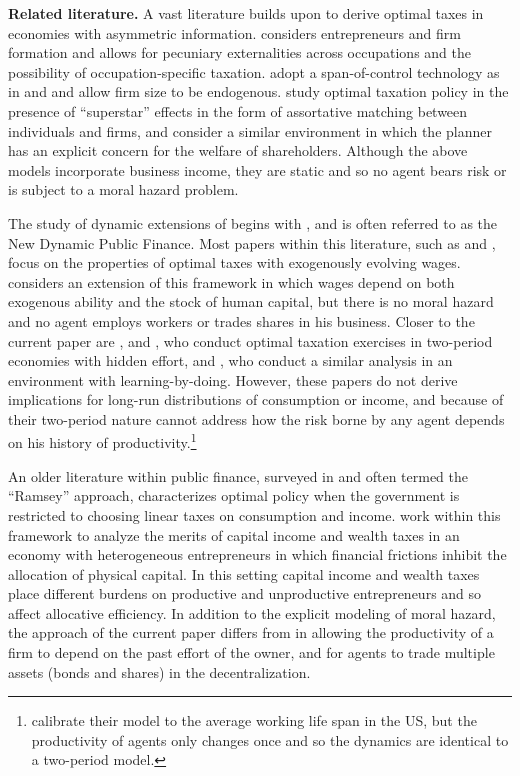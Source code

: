 \documentclass[11pt]{article}
\theoremstyle{plain}
\begin{document}
\textbf{Related literature.} A vast literature builds upon \cite{mirrlees_exploration_1971} to derive optimal taxes in economies with asymmetric information. \cite{scheuer_entrepreneurial_2014} considers entrepreneurs and firm formation and allows for pecuniary externalities across occupations and the possibility of occupation-specific taxation. \cite{ales_taxing_2017} adopt a span-of-control technology as in \cite{rosen_authority_1982} and \cite{lucas_size_1978} and allow firm size to be endogenous. \cite{scheuer_taxation_2017} study optimal taxation policy in the presence of ``superstar'' effects in the form of assortative matching between individuals and firms, and \cite{ales_taxing_2016} consider a similar environment in which the planner has an explicit concern for the welfare of shareholders. Although the above models incorporate business income, they are static and so no agent bears risk or is subject to a moral hazard problem. 

The study of dynamic extensions of \cite{mirrlees_exploration_1971} begins with \cite{golosov_optimal_2003}, and is often referred to as the New Dynamic Public Finance. Most papers within this literature, such as \cite{golosov_redistribution_2016} and \cite{farhi_insurance_2013}, focus on the properties of optimal taxes with exogenously evolving wages. \cite{stantcheva_optimal_2017} considers an extension of this framework in which wages depend on both exogenous ability and the stock of human capital, but there is no moral hazard and no agent employs workers or trades shares in his business. Closer to the current paper are \cite{albanesi_optimal_2006}, \cite{kapicka_optimal_2019} and \cite{best_optimal_2012}, who conduct optimal taxation exercises in two-period economies with hidden effort, and \cite{makris_taxation_2021}, who conduct a similar analysis in an environment with learning-by-doing. However, these papers do not derive implications for long-run distributions of consumption or income, and because of their two-period nature cannot address how the risk borne by any agent depends on his history of productivity.\footnote{\cite{makris_taxation_2021} calibrate their model to the average working life span in the US, but the productivity of agents only changes once and so the dynamics are identical to a two-period model.} 


An older literature within public finance, surveyed in \cite{chari_optimal_1999} and often termed the ``Ramsey'' approach, characterizes optimal policy when the government is restricted to choosing linear taxes on consumption and income. \cite{guvenen_use_2023} work within this framework to analyze the merits of capital income and wealth taxes in an economy with heterogeneous entrepreneurs in which financial frictions inhibit the allocation of physical capital. In this setting capital income and wealth taxes place different burdens on productive and unproductive entrepreneurs and so affect allocative efficiency. In addition to the explicit modeling of moral hazard, the approach of the current paper differs from \cite{guvenen_use_2023} in allowing the productivity of a firm to depend on the past effort of the owner, and for agents to trade multiple assets (bonds and shares) in the decentralization.
\end{document}
